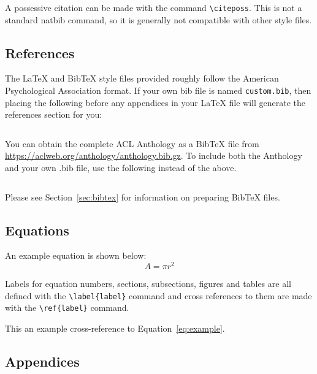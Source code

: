 \documentclass[11pt]{article}
\begin{document}
A possessive citation can be made with the command \verb|\citeposs|.
This is not a standard natbib command, so it is generally not compatible
with other style files.

\subsection{References}

\nocite{Ando2005,andrew2007scalable,rasooli-tetrault-2015}

The \LaTeX{} and Bib\TeX{} style files provided roughly follow the American Psychological Association format.
If your own bib file is named \texttt{custom.bib}, then placing the following before any appendices in your \LaTeX{} file will generate the references section for you:
\begin{quote}
\begin{verbatim}

\end{verbatim}
\end{quote}

You can obtain the complete ACL Anthology as a Bib\TeX{} file from \url{https://aclweb.org/anthology/anthology.bib.gz}.
To include both the Anthology and your own .bib file, use the following instead of the above.
\begin{quote}
\begin{verbatim}

\end{verbatim}
\end{quote}

Please see Section~\ref{sec:bibtex} for information on preparing Bib\TeX{} files.

\subsection{Equations}

An example equation is shown below:
\begin{equation}
  \label{eq:example}
  A = \pi r^2
\end{equation}

Labels for equation numbers, sections, subsections, figures and tables
are all defined with the \verb|\label{label}| command and cross references
to them are made with the \verb|\ref{label}| command.

This an example cross-reference to Equation~\ref{eq:example}.

\subsection{Appendices}
\end{document}
